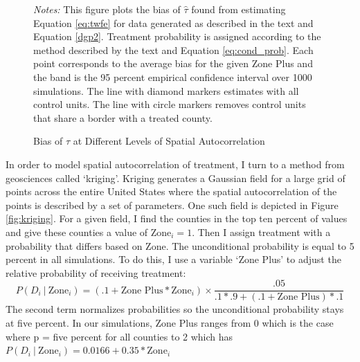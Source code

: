 \documentclass[11pt]{article}
\begin{document}
\begin{figure}[htb!]
    \caption{Bias of $\hat{\tau}$ at Different Levels of Spatial Autocorrelation}
    \label{fig:bias_spatial_autocorr}
    {\centering
    }
    {\footnotesize
        \textit{Notes:} This figure plots the bias of $\hat{\tau}$ found from estimating Equation \ref{eq:twfe} for data generated as described in the text and Equation \ref{dgp2}. Treatment probability is assigned according to the method described by the text and Equation \ref{eq:cond_prob}. Each point corresponds to the average bias for the given Zone Plus and the band is the 95 percent empirical confidence interval over 1000 simulations. The line with diamond markers estimates with all control units. The line with circle markers removes control units that share a border with a treated county. 
    }
\end{figure}

In order to model spatial autocorrelation of treatment, I turn to a method from geosciences called `kriging'. Kriging generates a Gaussian field for a large grid of points across the entire United States where the spatial autocorrelation of the points is described by a set of parameters. One such field is depicted in Figure \ref{fig:kriging}. For a given field, I find the counties in the top ten percent of values and give these counties a value of $\text{Zone}_i = 1$. Then I assign treatment with a probability that differs based on Zone. The unconditional probability is equal to 5 percent in all simulations. To do this, I use a variable `Zone Plus' to adjust the relative probability of receiving treatment: 
\begin{equation}
    \label{eq:cond_prob}
    P(D_i \ \vert \ \text{Zone}_i) = (.1 + \text{Zone Plus} * \text{Zone}_i) \times \frac{.05}{.1 * .9 + (.1 + \text{Zone Plus}) * .1}
\end{equation}
The second term normalizes probabilities so the unconditional probability stays at five percent. In our simulations, Zone Plus ranges from 0 which is the case where p = five percent for all counties to 2 which has $P(D_i \ \vert \ \text{Zone}_i) = 0.0166 + 0.35 * \text{Zone}_i$
\end{document}
